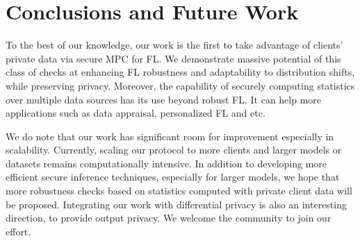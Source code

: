 \section{Conclusions and Future Work}
To the best of our knowledge, our work is the first to take advantage of clients' private data via secure MPC for FL. We demonstrate massive potential of this class of checks at enhancing FL robustness and adaptability to distribution shifts, while preserving privacy. Moreover, the capability of securely computing statistics over multiple data sources has its use beyond robust FL. It can help more applications such as data appraisal, personalized FL and etc. 

We do note that our work has significant room for improvement especially in scalability. Currently, scaling our protocol to more clients and larger models or datasets remains computationally intensive. In addition to developing more efficient secure inference techniques, especially for larger models, we hope that more robustness checks based on statistics computed with private client data will be proposed. Integrating our work with differential privacy is also an interesting direction, to provide output privacy. We welcome the community to join our effort.


